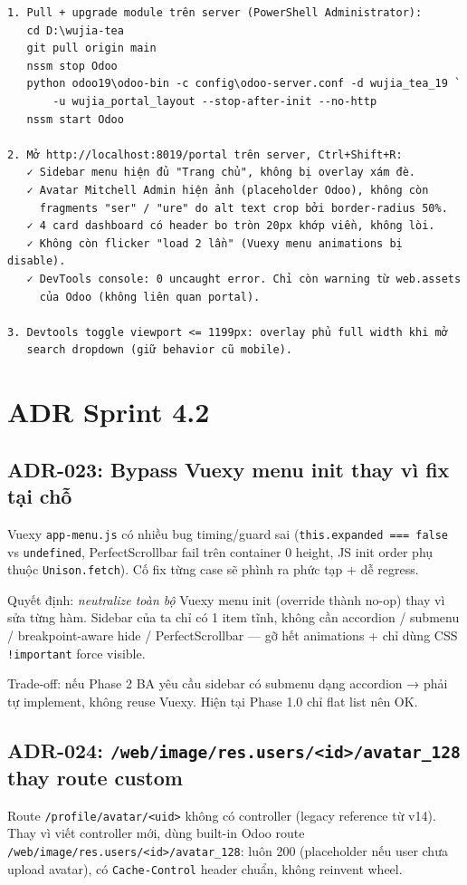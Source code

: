 \begin{lstlisting}[style=shell]
1. Pull + upgrade module trên server (PowerShell Administrator):
   cd D:\wujia-tea
   git pull origin main
   nssm stop Odoo
   python odoo19\odoo-bin -c config\odoo-server.conf -d wujia_tea_19 `
       -u wujia_portal_layout --stop-after-init --no-http
   nssm start Odoo

2. Mở http://localhost:8019/portal trên server, Ctrl+Shift+R:
   ✓ Sidebar menu hiện đủ "Trang chủ", không bị overlay xám đè.
   ✓ Avatar Mitchell Admin hiện ảnh (placeholder Odoo), không còn
     fragments "ser" / "ure" do alt text crop bởi border-radius 50%.
   ✓ 4 card dashboard có header bo tròn 20px khớp viền, không lòi.
   ✓ Không còn flicker "load 2 lần" (Vuexy menu animations bị disable).
   ✓ DevTools console: 0 uncaught error. Chỉ còn warning từ web.assets
     của Odoo (không liên quan portal).

3. Devtools toggle viewport <= 1199px: overlay phủ full width khi mở
   search dropdown (giữ behavior cũ mobile).
\end{lstlisting}

\section{ADR Sprint 4.2}

\subsection{ADR-023: Bypass Vuexy menu init thay vì fix tại chỗ}

Vuexy \texttt{app-menu.js} có nhiều bug timing/guard sai (\texttt{this.expanded === false} vs \texttt{undefined}, PerfectScrollbar fail trên container 0 height, JS init order phụ thuộc \texttt{Unison.fetch}). Cố fix từng case sẽ phình ra phức tạp + dễ regress.

Quyết định: \emph{neutralize toàn bộ} Vuexy menu init (override thành no-op) thay vì sửa từng hàm. Sidebar của ta chỉ có 1 item tĩnh, không cần accordion / submenu / breakpoint-aware hide / PerfectScrollbar — gỡ hết animations + chỉ dùng CSS \texttt{!important} force visible.

Trade-off: nếu Phase 2 BA yêu cầu sidebar có submenu dạng accordion → phải tự implement, không reuse Vuexy. Hiện tại Phase 1.0 chỉ flat list nên OK.

\subsection{ADR-024: \texttt{/web/image/res.users/<id>/avatar\_128} thay route custom}

Route \texttt{/profile/avatar/<uid>} không có controller (legacy reference từ v14). Thay vì viết controller mới, dùng built-in Odoo route \texttt{/web/image/res.users/<id>/avatar\_128}: luôn 200 (placeholder nếu user chưa upload avatar), có \texttt{Cache-Control} header chuẩn, không reinvent wheel.

